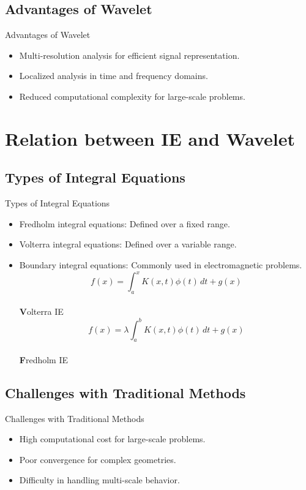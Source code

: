 \documentclass{beamer}
\begin{document}
\subsection{Advantages of Wavelet}
\begin{frame}{Advantages of Wavelet}
    \begin{itemize}
        \item Multi-resolution analysis for efficient signal representation.
        \item Localized analysis in time and frequency domains.
        \item Reduced computational complexity for large-scale problems.
    \end{itemize}
\end{frame}

\section{Relation between IE and Wavelet}
\subsection{Types of Integral Equations}
\begin{frame}{Types of Integral Equations}
    \begin{itemize}
        \item Fredholm integral equations: Defined over a fixed range.
        \item Volterra integral equations: Defined over a variable range.
        \item Boundary integral equations: Commonly used in electromagnetic problems.
        \centering
        \[
              f(x) = \int_a^x K(x, t)\phi(t) \,dt + g(x)
        \]
        \\[0.2cm]
        {\small \textbf Volterra IE}
        \[
              f(x) = \lambda \int_a^b K(x, t)\phi(t) \,dt + g(x)
        \]
        \\[0.2cm]
        {\small \textbf Fredholm IE}
    \end{itemize}
\end{frame}

\subsection{Challenges with Traditional Methods}
\begin{frame}{Challenges with Traditional Methods}
    \begin{itemize}
        \item High computational cost for large-scale problems.
        \item Poor convergence for complex geometries.
        \item Difficulty in handling multi-scale behavior.
    \end{itemize}
\end{frame}
\end{document}
